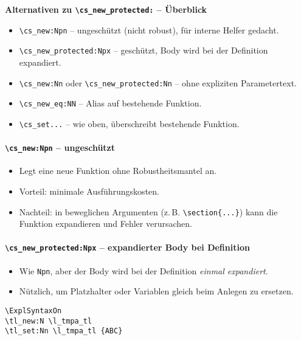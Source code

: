 \documentclass[11pt,a4paper]{book}
\begin{document}
\begin{description}
\textbf{Alternativen zu \texttt{\textbackslash cs\_new\_protected:} -- Überblick}

\begin{itemize}
  \item \verb|\cs_new:Npn| – ungeschützt (nicht robust), für interne Helfer gedacht.
  \item \verb|\cs_new_protected:Npx| – geschützt, Body wird bei der Definition expandiert.
  \item \verb|\cs_new:Nn| oder \verb|\cs_new_protected:Nn| – ohne expliziten Parametertext.
  \item \verb|\cs_new_eq:NN| – Alias auf bestehende Funktion.
  \item \verb|\cs_set...| – wie oben, überschreibt bestehende Funktion.
\end{itemize}

\paragraph{\texttt{\textbackslash cs\_new:Npn} – ungeschützt}
\begin{itemize}
  \item Legt eine neue Funktion ohne Robustheitsmantel an.
  \item Vorteil: minimale Ausführungskosten.
  \item Nachteil: in beweglichen Argumenten (z.\,B. \verb|\section{...}|) kann die Funktion expandieren und Fehler verursachen.
\end{itemize}

\paragraph{\texttt{\textbackslash cs\_new\_protected:Npx} – expandierter Body bei Definition}
\begin{itemize}
  \item Wie \verb|Npn|, aber der Body wird bei der Definition \emph{einmal expandiert}.
  \item Nützlich, um Platzhalter oder Variablen gleich beim Anlegen zu ersetzen.
\end{itemize}

\begin{verbatim}
\ExplSyntaxOn
\tl_new:N \l_tmpa_tl
\tl_set:Nn \l_tmpa_tl {ABC}


\end{verbatim}
\end{description}
\end{document}

